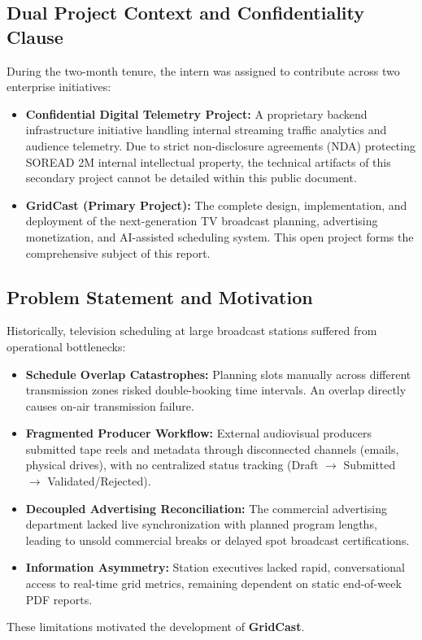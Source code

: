 \documentclass[12pt,a4paper,oneside]{report}
\begin{document}
\subsection{Dual Project Context and Confidentiality Clause}
During the two-month tenure, the intern was assigned to contribute across two enterprise initiatives:
\begin{itemize}
    \item \textbf{Confidential Digital Telemetry Project:} A proprietary backend infrastructure initiative handling internal streaming traffic analytics and audience telemetry. Due to strict non-disclosure agreements (NDA) protecting SOREAD 2M internal intellectual property, the technical artifacts of this secondary project cannot be detailed within this public document.
    \item \textbf{GridCast (Primary Project):} The complete design, implementation, and deployment of the next-generation TV broadcast planning, advertising monetization, and AI-assisted scheduling system. This open project forms the comprehensive subject of this report.
\end{itemize}

\subsection{Problem Statement and Motivation}
Historically, television scheduling at large broadcast stations suffered from operational bottlenecks:
\begin{itemize}
    \item \textbf{Schedule Overlap Catastrophes:} Planning slots manually across different transmission zones risked double-booking time intervals. An overlap directly causes on-air transmission failure.
    \item \textbf{Fragmented Producer Workflow:} External audiovisual producers submitted tape reels and metadata through disconnected channels (emails, physical drives), with no centralized status tracking (Draft $\rightarrow$ Submitted $\rightarrow$ Validated/Rejected).
    \item \textbf{Decoupled Advertising Reconciliation:} The commercial advertising department lacked live synchronization with planned program lengths, leading to unsold commercial breaks or delayed spot broadcast certifications.
    \item \textbf{Information Asymmetry:} Station executives lacked rapid, conversational access to real-time grid metrics, remaining dependent on static end-of-week PDF reports.
\end{itemize}
These limitations motivated the development of \textbf{GridCast}.
\end{document}
